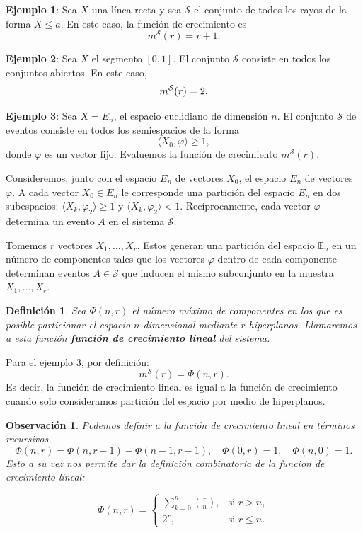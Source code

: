 \documentclass{article}
\newtheorem{dfn}{Definición}[subsection]
\newtheorem{obs}{Observación}[subsection]
\begin{document}
\textbf{Ejemplo 1}: Sea \( X \) una línea recta y sea \( \mathcal{S} \) el conjunto 
de todos los rayos de la forma \( X \leq a \). En este caso, la función de crecimiento es  
\[
m^{\mathcal{S}}(r) = r + 1.
\]

\textbf{Ejemplo 2}: Sea \( X \) el segmento \([0,1]\). El conjunto \( \mathcal{S} \) 
consiste en todos los conjuntos abiertos. En este caso,  
\[
m^{\mathcal{S}}(r) = 2.\newline
\]

\textbf{Ejemplo 3}: Sea \( X = E_n \), el espacio euclidiano de dimensión \( n \). 
El conjunto \( \mathcal{S} \) de eventos consiste en todos los semiespacios de la forma  
\[
\langle X_0, \varphi \rangle \geq 1,
\]  
donde \( \varphi \) es un vector fijo. Evaluemos la función de crecimiento \( m^{\mathcal{S}}(r) \).

Consideremos, junto con el espacio \( E_n \) de vectores \( X_0 \), el espacio \( E_n \) 
de vectores \( \varphi \). A cada vector \( X_0 \in E_n \) le corresponde una partición 
del espacio \( E_n \) en dos subespacios: \(\langle X_k, \varphi_2 \rangle \geq 1\) y \(\langle X_k, \varphi_2 \rangle < 1\). 
Recíprocamente, cada vector \(\varphi\) determina un evento $A$ en el sistema \(\mathcal{S}\).\newline

Tomemos \( r \) vectores \( X_1, \dots, X_r \). Estos generan una partición del espacio \( \mathbb{E}_n \) 
en un número de componentes tales que los vectores \( \varphi \) dentro de cada componente determinan eventos 
\( A \in \mathcal{S} \) que inducen el mismo subconjunto en la muestra \( X_1, \dots, X_r \).\newline

\begin{dfn}
    Sea \( \Phi(n, r) \) el número máximo de componentes en los que es posible particionar el espacio \( n \)-dimensional 
mediante \( r \) hiperplanos. Llamaremos a esta función \textbf{función de crecimiento lineal} del sistema.
\end{dfn}


Para el ejemplo 3, por definición:
\[
    m^{\mathcal{S}}(r) = \Phi(n, r).
\]
Es decir, la función de crecimiento lineal es igual a la función de crecimiento cuando solo consideramos partición
del espacio por medio de hiperplanos.

\begin{obs}
Podemos definir a la función de crecimiento lineal en términos recursivos. 
\[
    \Phi(n, r) = \Phi(n, r - 1) + \Phi(n - 1, r - 1),\quad \Phi(0, r) = 1, \quad \Phi(n, 0) = 1.
\]
Esto a su vez nos permite dar la definición combinatoria de la funcion de crecimiento lineal:

\begin{equation}
\Phi(n, r) =
\begin{cases}
\sum\limits_{k=0}^{n} \binom{r}{n}, & \text{si } r > n, \\
2^r, & \text{si } r \leq n.
\end{cases}
\label{def: combinatoria función crecimiento lineal}
\end{equation}
\end{obs}
\end{document}
